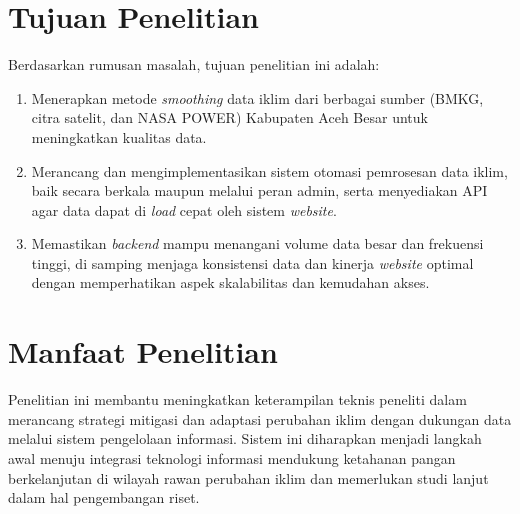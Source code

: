 \section{Tujuan Penelitian}
    Berdasarkan rumusan masalah, tujuan penelitian ini adalah:
\begin{enumerate}
    \item Menerapkan metode \textit{smoothing} data iklim dari berbagai sumber (BMKG, citra satelit, dan NASA POWER) Kabupaten Aceh Besar untuk meningkatkan kualitas data.

    \item Merancang dan mengimplementasikan sistem otomasi pemrosesan data iklim, baik secara berkala maupun melalui peran admin, serta menyediakan API agar data dapat di \textit{load} cepat oleh sistem \textit{website}.
    
    \item Memastikan \textit{backend} mampu menangani volume data besar dan frekuensi tinggi, di samping menjaga konsistensi data dan kinerja \textit{website} optimal dengan memperhatikan aspek skalabilitas dan kemudahan akses.
\end{enumerate}
\section{Manfaat Penelitian}
Penelitian ini membantu meningkatkan keterampilan teknis peneliti dalam merancang strategi mitigasi dan adaptasi perubahan iklim dengan dukungan data melalui sistem pengelolaan informasi. Sistem ini diharapkan menjadi langkah awal menuju integrasi teknologi informasi mendukung ketahanan pangan berkelanjutan di wilayah rawan perubahan iklim dan memerlukan studi lanjut dalam hal pengembangan riset.



